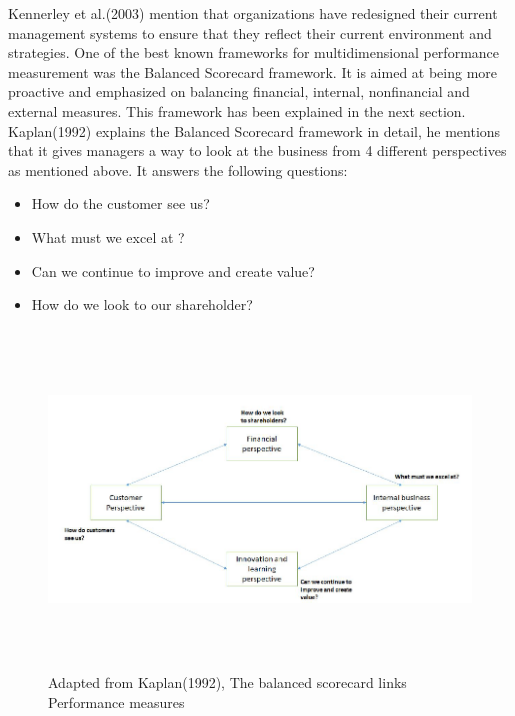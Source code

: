 Kennerley et al.(2003) mention that organizations have redesigned their current management systems  to ensure that they reflect their current environment and strategies. One of the best known frameworks for multidimensional performance measurement was the Balanced Scorecard framework. It is aimed at being more proactive and emphasized on balancing financial, internal, nonfinancial and external measures. This framework has been explained in the next section. \\ 

Kaplan(1992) explains the Balanced Scorecard framework in detail, he mentions that it gives managers a way to look at the business from 4 different perspectives as mentioned above. It answers the following questions:\\

\begin{itemize}
    \item How do the customer see us?
    \item What must we excel at ?
    \item Can we continue to improve and create value?
    \item How do we look to our shareholder?\\
\end{itemize} 

\begin{figure}[H]
    \centering
    \captionsetup{justification=centering, margin=2cm}
    \vspace{1cm}
    \includegraphics[width=14cm, height=9cm]{figure/auxiliary/fig41.PNG}
    \caption{Adapted from Kaplan(1992), The balanced scorecard links Performance measures}
    \label{fig:4.1}
\end{figure}


